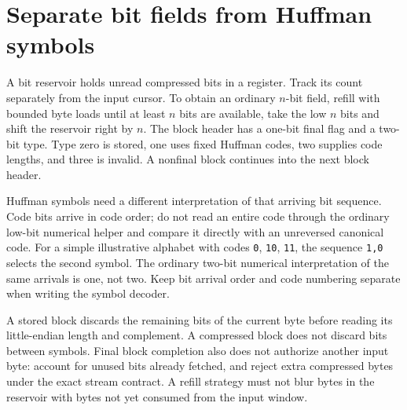 \section{Separate bit fields from Huffman symbols}
A bit reservoir holds unread compressed bits in a register. Track its count separately
from the input cursor. To obtain an ordinary $n$-bit field, refill with bounded byte
loads until at least $n$ bits are available, take the low $n$ bits and shift the
reservoir right by $n$. The block header has a one-bit final flag and a two-bit type.
Type zero is stored, one uses fixed Huffman codes, two supplies code lengths, and
three is invalid. A nonfinal block continues into the next block header.

Huffman symbols need a different interpretation of that arriving bit sequence.
Code bits arrive in code order; do not read an entire code through the ordinary
low-bit numerical helper and compare it directly with an unreversed canonical code.
For a simple illustrative alphabet with codes \texttt{0}, \texttt{10}, \texttt{11},
the sequence \texttt{1,0} selects the second symbol. The ordinary two-bit numerical
interpretation of the same arrivals is one, not two. Keep bit arrival order and code
numbering separate when writing the symbol decoder.

A stored block discards the remaining bits of the current byte before reading its
little-endian length and complement. A compressed block does not discard bits between
symbols. Final block completion also does not authorize another input byte: account
for unused bits already fetched, and reject extra compressed bytes under the exact
stream contract. A refill strategy must not blur bytes in the reservoir with bytes
not yet consumed from the input window.
